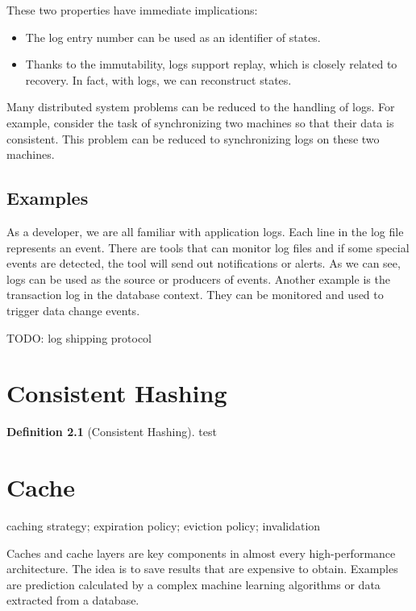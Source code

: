 \documentclass[letterpaper, oneside]{book}
\theoremstyle{definition}
\newtheorem*{definition}{Definition}
\theoremstyle{remark}
\begin{document}
These two properties have immediate implications:
\begin{itemize}
    \item The log entry number can be used as an identifier of states.
    \item Thanks to the immutability, logs support replay, which is closely related to recovery. In fact, with logs, we can reconstruct states.
\end{itemize}

Many distributed system problems can be reduced to the handling of logs. For example, consider the task of synchronizing two machines so that their data is consistent. This problem can be reduced to synchronizing logs on these two machines.

\section{Examples}
As a developer, we are all familiar with application logs. Each line in the log file represents an event. There are tools that can monitor log files and if some special events are detected, the tool will send out notifications or alerts. As we can see, logs can be used as the source or producers of events. Another example is the transaction log in the database context. They can be monitored and used to trigger data change events.

TODO: log shipping protocol

\chapter{Consistent Hashing}
\begin{definition}[Consistent Hashing]
    test
\end{definition}

\chapter{Cache}

caching strategy; expiration policy; eviction policy; invalidation

Caches and cache layers are key components in almost every high-performance architecture. The idea is to save results that are expensive to obtain. Examples are prediction calculated by a complex machine learning algorithms or data extracted from a database.
\end{document}
